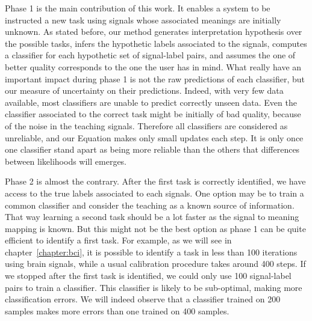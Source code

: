 Phase 1 is the main contribution of this work. It enables a system to be instructed a new task using signals whose associated meanings are initially unknown. As stated before, our method generates interpretation hypothesis over the possible tasks, infers the hypothetic labels associated to the signals, computes a classifier for each hypothetic set of signal-label pairs, and assumes the one of better quality corresponds to the one the user has in mind. What really have an important impact during phase 1 is not the raw predictions of each classifier, but our measure of uncertainty on their predictions. Indeed, with very few data available, most classifiers are unable to predict correctly unseen data. Even the classifier associated to the correct task might be initially of bad quality, because of the noise in the teaching signals. Therefore all classifiers are considered as unreliable, and our Equation makes only small updates each step. It is only once one classifier stand apart as being more reliable than the others that differences between likelihoods will emerges.


Phase 2 is almost the contrary. After the first task is correctly identified, we have access to the true labels associated to each signals. One option may be to train a common classifier and consider the teaching as a known source of information. That way learning a second task should be a lot faster as the signal to meaning mapping is known. But this might not be the best option as phase 1 can be quite efficient to identify a first task. For example, as we will see in chapter~\ref{chapter:bci}, it is possible to identify a task in less than 100 iterations using brain signals, while a usual calibration procedure takes around 400 steps. If we stopped after the first task is identified, we could only use 100 signal-label pairs to train a classifier. This classifier is likely to be sub-optimal, making more classification errors. We will indeed observe that a classifier trained on 200 samples makes more errors than one trained on 400 samples.

